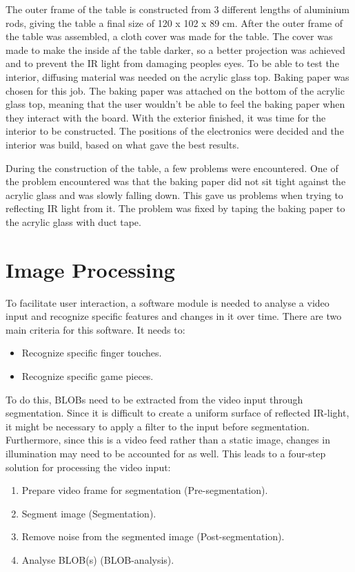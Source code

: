 The outer frame of the table is constructed from 3 different lengths of aluminium rods, giving the table a final size of 120 x 102 x 89 cm.
After the outer frame of the table was assembled, a cloth cover was made for the table. The cover was made to make the inside af the table darker, so a better projection was achieved and to prevent the IR light from damaging peoples eyes. To be able to test the interior, diffusing material was needed on the acrylic glass top. Baking paper was chosen for this job. The baking paper was attached on the bottom of the acrylic glass top, meaning that the user wouldn't be able to feel the baking paper when they interact with the board. 
With the exterior finished, it was time for the interior to be constructed. The positions of the electronics were decided and the interior was build, based on what gave the best results. 

During the construction of the table, a few problems were encountered. One of the problem encountered was that the baking paper did not sit tight against the acrylic glass and was slowly falling down. This gave us problems when trying to reflecting IR light from it. The problem was fixed by taping the baking paper to the acrylic glass with duct tape. 

\section{Image Processing}
To facilitate user interaction, a software module is needed to analyse a video input and recognize specific features and changes in it over time. There are two main criteria for this software. It needs to:
\begin{itemize}
\item Recognize specific finger touches.
\item Recognize specific game pieces.
\end{itemize}

To do this, BLOBs need to be extracted from the video input through segmentation. Since it is difficult to create a uniform surface of reflected IR-light, it might be necessary to apply a filter to the input before segmentation. Furthermore, since this is a video feed rather than a static image, changes in illumination may need to be accounted for as well. This leads to a four-step solution for processing the video input:
\begin{enumerate}
\item Prepare video frame for segmentation (Pre-segmentation).
\item Segment image (Segmentation).
\item Remove noise from the segmented image (Post-segmentation).
\item Analyse BLOB(s) (BLOB-analysis).
\end{enumerate}


